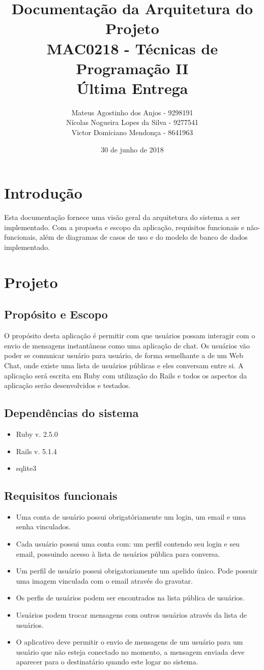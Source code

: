 \documentclass[11pt,a4paper,titlepage]{article}
\title{Documentação da Arquitetura do Projeto \\
MAC0218 - Técnicas de Programação II\\
Última Entrega}
\author{Mateus Agostinho dos Anjos - 9298191\\Nícolas Nogueira Lopes da Silva - 9277541\\Victor Domiciano Mendonça - 8641963}
\date{30 de junho de 2018}
\begin{document}
\maketitle

\tableofcontents

\pagebreak

\section{Introdução}
Esta documentação fornece uma visão geral da arquitetura do sistema a ser implementado. Com a proposta e escopo da aplicação, requisitos funcionais e não-funcionais, além de diagramas de casos de uso e do modelo de banco de dados implementado.

\section{Projeto}
\subsection{Propósito e Escopo}
O propósito desta aplicação é permitir com que usuários possam interagir com o envio de mensagens instantâneas como uma aplicação de chat. Os usuários vão poder se comunicar usuário para usuário, de forma semelhante a de um Web Chat, onde existe uma lista de usuários públicas e eles conversam entre si. A aplicação será escrita em Ruby com utilização do Rails e todos os aspectos da aplicação serão desenvolvidos e testados.
\subsection{Dependências do sistema}
\begin{itemize}
\item Ruby v. 2.5.0
\item Rails v. 5.1.4
\item sqlite3
\end{itemize}
\subsection{Requisitos funcionais}
\begin{itemize}
\item Uma conta de usuário possui obrigatóriamente um login, um email e uma senha vinculados.
\item Cada usuário possui uma conta com: um perfil contendo seu login e seu email, possuindo acesso à lista de usuários pública para conversa. 
\item Um perfil de usuário possui obrigatoriamente um apelido único. Pode possuir uma imagem vinculada com o email através do gravatar.
\item Os perfis de usuários podem ser encontrados na lista pública de usuários.
\item Usuários podem trocar mensagens com outros usuários através da lista de usuários.
\item O aplicativo deve permitir o envio de mensagens de um usuário para um usuário que não esteja conectado no momento, a mensagem enviada deve aparecer para o destinatário quando este logar no sistema.
\end{itemize}
\end{document}

